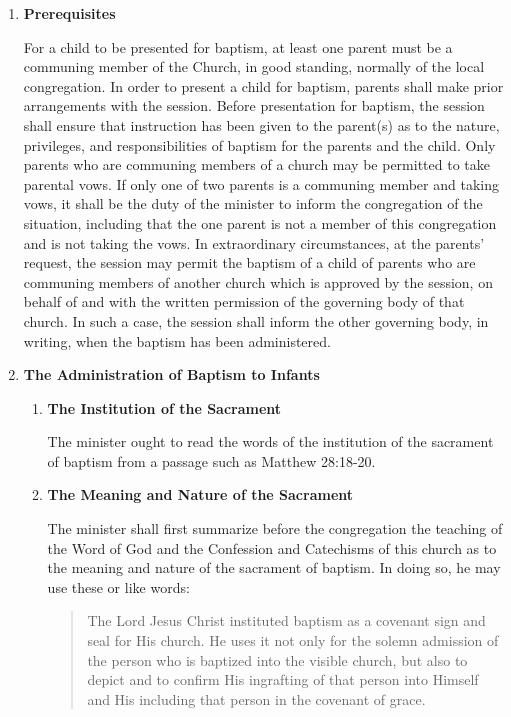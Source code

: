 \documentclass[
]{book}
\begin{document}
\protect\hypertarget{chapter-slug-57-the-baptism-of-infants}{\href{}{}}

\begin{enumerate}
\def\labelenumi{\arabic{enumi}.}
\item
  \protect\hypertarget{57}{\href{}{}}\textbf{Prerequisites}

  For a child to be presented for baptism, at least one parent must be a communing member of the Church, in good standing, normally of the local congregation. In order to present a child for baptism, parents shall make prior arrangements with the session. Before presentation for baptism, the session shall ensure that instruction has been given to the parent(s) as to the nature, privileges, and responsibilities of baptism for the parents and the child. Only parents who are communing members of a church may be permitted to take parental vows. If only one of two parents is a communing member and taking vows, it shall be the duty of the minister to inform the congregation of the situation, including that the one parent is not a member of this congregation and is not taking the vows. In extraordinary circumstances, at the parents' request, the session may permit the baptism of a child of parents who are communing members of another church which is approved by the session, on behalf of and with the written permission of the governing body of that church. In such a case, the session shall inform the other governing body, in writing, when the baptism has been administered.
\item
  \textbf{The Administration of Baptism to Infants}

  \begin{enumerate}
  \def\labelenumii{\alph{enumii}.}
  \item
    \textbf{The Institution of the Sacrament}

    The minister ought to read the words of the institution of the sacrament of baptism from a passage such as Matthew 28:18-20.
  \item
    \textbf{The Meaning and Nature of the Sacrament}

    The minister shall first summarize before the congregation the teaching of the Word of God and the Confession and Catechisms of this church as to the meaning and nature of the sacrament of baptism. In doing so, he may use these or like words:

    \begin{quote}
    The Lord Jesus Christ instituted baptism as a covenant sign and seal for His church. He uses it not only for the solemn admission of the person who is baptized into the visible church, but also to depict and to confirm His ingrafting of that person into Himself and His including that person in the covenant of grace.


\end{quote}
\end{enumerate}
\end{enumerate}
\end{document}
